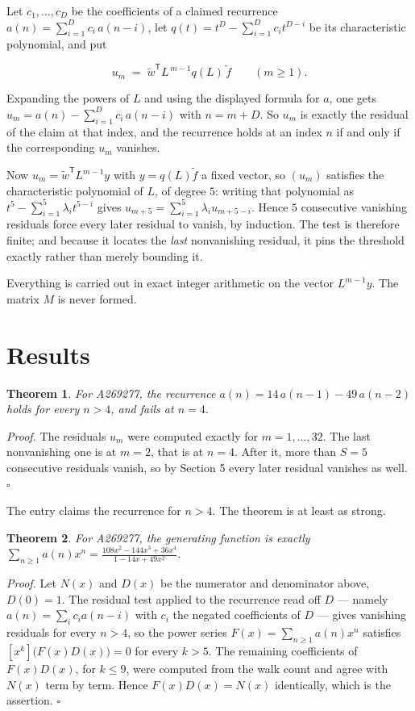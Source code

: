 \documentclass[11pt]{article}
\newtheorem{theorem}{Theorem}
\theoremstyle{definition}
\begin{document}
Let $c_1,\dots,c_D$ be the coefficients of a claimed recurrence $a(n) = \sum_{i=1}^{D} c_i\,a(n-i)$, let $q(t) = t^{D} - \sum_{i=1}^{D} c_i t^{D-i}$ be its characteristic polynomial, and put

\[u_m \;=\; \tilde w^{\mathsf T} L^{\,m-1} q(L)\,\tilde f \qquad (m \ge 1).\]

Expanding the powers of $L$ and using the displayed formula for $a$, one gets $u_m = a(n) - \sum_{i=1}^{D} c_i\,a(n-i)$ with $n = m + D$. So $u_m$ is exactly the residual of the claim at that index, and the recurrence holds at an index $n$ if and only if the corresponding $u_m$ vanishes.

Now $u_m = \tilde w^{\mathsf T} L^{m-1} y$ with $y = q(L)\tilde f$ a fixed vector, so $(u_m)$ satisfies the characteristic polynomial of $L$, of degree $5$: writing that polynomial as $t^{5} - \sum_{i=1}^{5} \lambda_i t^{5-i}$ gives $u_{m+5} = \sum_{i=1}^{5} \lambda_i u_{m+5-i}$. Hence $5$ consecutive vanishing residuals force every later residual to vanish, by induction. The test is therefore finite; and because it locates the {\itshape last} nonvanishing residual, it pins the threshold exactly rather than merely bounding it.

Everything is carried out in exact integer arithmetic on the vector $L^{m-1}y$. The matrix $M$ is never formed.

\section{Results}

\begin{theorem} For A269277, the recurrence $a(n) = 14\,a(n-1) - 49\,a(n-2)$ holds for every $n > 4$, and fails at $n = 4$.\end{theorem}

{\itshape Proof.} The residuals $u_m$ were computed exactly for $m = 1,\dots,32$. The last nonvanishing one is at $m = 2$, that is at $n = 4$. After it, more than $S = 5$ consecutive residuals vanish, so by Section 5 every later residual vanishes as well. $\square$

The entry claims the recurrence for $n > 4$. The theorem is at least as strong.

\begin{theorem} For A269277, the generating function is exactly $\sum_{n\ge 1} a(n)x^n = \frac{108x^{2} - 144x^{3} + 36x^{4}}{1 - 14x + 49x^{2}}$.\end{theorem}

{\itshape Proof.} Let $N(x)$ and $D(x)$ be the numerator and denominator above, $D(0)=1$. The residual test applied to the recurrence read off $D$ --- namely $a(n) = \sum_i c_i a(n-i)$ with $c_i$ the negated coefficients of $D$ --- gives vanishing residuals for every $n > 4$, so the power series $F(x)=\sum_{n\ge 1}a(n)x^n$ satisfies $[x^k]\bigl(F(x)D(x)\bigr) = 0$ for every $k > 5$. The remaining coefficients of $F(x)D(x)$, for $k \le 9$, were computed from the walk count and agree with $N(x)$ term by term. Hence $F(x)D(x) = N(x)$ identically, which is the assertion. $\square$
\end{document}
